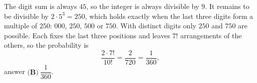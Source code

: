 The digit sum is always $45$, so the integer is always divisible by $9$. It remains to be divisible by $2\cdot5^3=250$, which holds exactly when the last three digits form a multiple of $250$: $000$, $250$, $500$ or $750$. With distinct digits only $250$ and $750$ are possible. Each fixes the last three positions and leaves $7!$ arrangements of the others, so the probability is
\[\dfrac{2\cdot7!}{10!}=\dfrac2{720}=\dfrac1{360},\]
answer $\boxed{\textbf{(B)}\ \dfrac1{360}}$.
